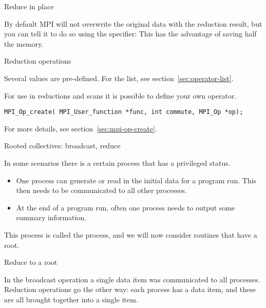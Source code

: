  {Reduce in place}
\label{sec:allreduce-inplace}

By default MPI will not overwrite the original data with the reduction
result, but you can tell it to do so
using the  specifier:
%
%
This has the advantage of saving half the memory.

 {Reduction operations}
\label{sec:mpi:op-create}

Several  values are pre-defined. For the list,
see section~\ref{sec:operator-list}.

For use in reductions and scans it is possible to define your own operator.

\begin{lstlisting}
MPI_Op_create( MPI_User_function *func, int commute, MPI_Op *op);
\end{lstlisting}

For more details, see section~\ref{sec:mpi-op-create}.

 {Rooted collectives: broadcast, reduce}
\label{sec:rooted}

In some scenarios there is a certain process that has a privileged status.
\begin{itemize}
\item
  One process can generate or read in the initial data for a program
  run. This then needs to be communicated to all other processes.
\item
  At the end of a program run, often
  one process needs to output some summary information.
\end{itemize}
This process is called the  process, and we will now
consider routines that have a root.

 {Reduce to a root}
\label{sec:reduce-root}

In the broadcast operation a single data item was communicated to all
processes. Reduction operations go the other way: each process has a
data item, and these are all brought together into a single item.

